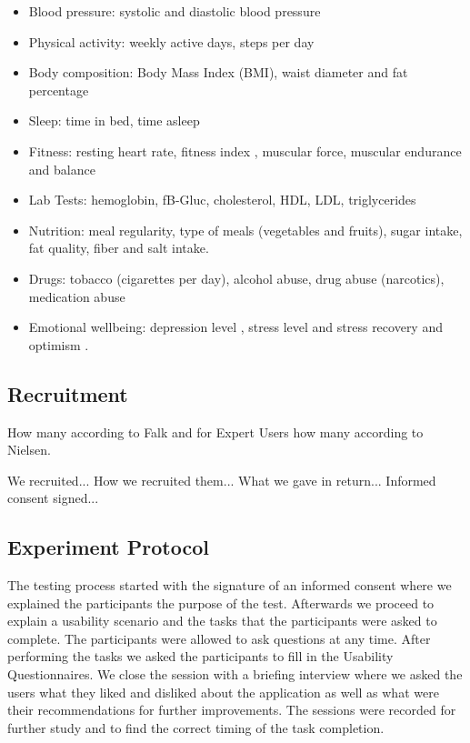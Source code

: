 \documentclass[twocolumn]{bmcart}%
\begin{document}
\begin{itemize}
	\item Blood pressure: systolic and diastolic blood pressure 
    \item Physical activity: weekly active days\cite{us2008physical, physical2008physical}, steps per day \cite{tudor2004many} 
    \item Body composition: Body Mass Index (BMI), waist diameter and fat percentage
    \item Sleep: time in bed, time asleep  
    \item Fitness: resting heart rate, fitness index \cite{oja2013tester,laukkanen1992validity}, muscular force, muscular endurance and balance \cite{suni2009fitness}
    \item Lab Tests: hemoglobin, fB-Gluc, cholesterol, HDL, LDL, triglycerides 
    \item Nutrition: meal regularity, type of meals (vegetables and fruits), sugar intake, fat quality, fiber and salt intake.
    \item Drugs: tobacco (cigarettes per day), alcohol abuse, drug abuse (narcotics), medication abuse
    \item Emotional wellbeing: depression level \cite{poutanen2010validity}, stress level and stress recovery \cite{firstbeat2014, teisala2014associations} and optimism \cite{scheier1994distinguishing}.
\end{itemize}	

\subsection*{Recruitment}

How many according to Falk and for Expert Users how many according to Nielsen.

We recruited...
How we recruited them...
What we gave in return...
Informed consent signed...

\subsection*{Experiment Protocol}


The testing process started with the signature of an informed consent where we explained the participants the purpose of the test. Afterwards we proceed to explain a usability scenario and the tasks that the participants were asked to complete. The participants were allowed to ask questions at any time. After performing the tasks we asked the participants to fill in the Usability Questionnaires. We close the session with a briefing interview where we asked the users what they liked and disliked about the application as well as what were their recommendations for further improvements. The sessions were recorded for further study and to find the correct timing of the task completion.
\end{document}
